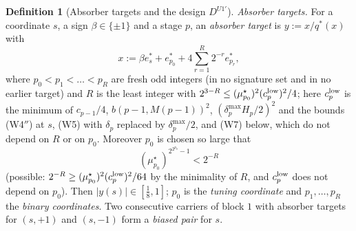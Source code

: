\documentclass[10pt]{amsart}
\theoremstyle{definition}
\newtheorem{definition}[theorem]{Definition}
\theoremstyle{remark}
\begin{document}
\begin{definition}[Absorber targets and the design $D^{U1'}$]\label{def:II-DU1}
\emph{Absorber targets.}  For a coordinate $s$, a sign $\beta\in\{\pm1\}$ and a
stage $p$, an \emph{absorber target} is $y:=x/q^*(x)$ with
\[
 x:=\beta e_s^*+e_{p_0}^*+4\sum_{r=1}^R2^{-r}e_{p_r}^*,
\]
where $p_0<p_1<\dots<p_R$ are fresh odd integers (in no signature set and in no
earlier target) and $R$ is the least integer with $2^{3-R}\le(\mu^\star_{p_0})^2
(c^{\rm low}_p)^2/4$; here $c^{\rm low}_p$ is the minimum of $c_{p-1}/4$,
$b(p-1,M(p-1))^2$, $(\delta^{\max}_pH_p/2)^2$ and the bounds (W4$''$) at $s$,
(W5) with $\delta_p$ replaced by $\delta^{\max}_p/2$, and (W7) below, which do
not depend on $R$ or on $p_0$.  Moreover $p_0$ is chosen so large that
\[
 (\mu^\star_{p_0})^{2^{2^{p_0}}-1}<2^{-R}
\]
(possible: $2^{-R}\ge(\mu^\star_{p_0})^2(c^{\rm low}_p)^2/64$ by the minimality
of $R$, and $c^{\rm low}_p$ does not depend on $p_0$).  Then $|y(s)|\in[\frac18,1]$;
$p_0$ is the \emph{tuning coordinate} and $p_1,\dots,p_R$ the \emph{binary
coordinates}.  Two consecutive carriers of block $1$ with absorber targets for
$(s,+1)$ and $(s,-1)$ form a \emph{biased pair} for $s$.


\end{definition}
\end{document}
